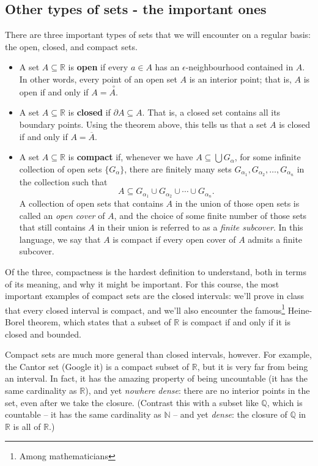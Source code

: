 \documentclass[12pt,letterpaper]{article}
\newcommand{\R}{\mathbb{R}}
\newcommand{\inter}[1]{\overset{\,\,\,\circ}{#1}}
\begin{document}
\subsection*{Other types of sets -  the important ones}
There are three important types of sets that we will encounter on a regular basis: the open, closed, and compact sets.
\begin{itemize}
\item A set $A\subseteq \R$ is {\bf open} if every $a\in A$ has an $\epsilon$-neighbourhood contained in $A$. In other words, every point of an open set $A$ is an interior point; that is, $A$ is open if and only if $A = \inter{A}$.
\item A set $A\subseteq \R$ is {\bf closed} if $\partial A\subseteq A$. That is, a closed set contains all its boundary points. Using the theorem above, this tells us that a set $A$ is closed if and only if $A=\overline{A}$.
\item A set $A\subseteq \R$ is {\bf compact} if, whenever we have $A\subseteq \bigcup G_\alpha$, for some infinite collection of open sets $\{G_\alpha\}$, there are finitely many sets $G_{\alpha_1},G_{\alpha_2},\ldots, G_{\alpha_n}$ in the collection such that
\[
A\subseteq G_{\alpha_1}\cup G_{\alpha_2}\cup \cdots \cup G_{\alpha_n}.
\]
A collection of open sets that contains $A$ in the union of those open sets is called an {\em open cover} of $A$, and the choice of some finite number of those sets that still contains $A$ in their union is referred to as a {\em finite subcover}. In this language, we say that $A$ is compact if every open cover of $A$ admits a finite subcover.
\end{itemize}
Of the three, compactness is the hardest definition to understand, both in terms of its meaning, and why it might be important. For this course, the most important examples of compact sets are the closed intervals: we'll prove in class that every closed interval is compact, and we'll also encounter the famous\footnote{Among mathematicians} Heine-Borel theorem, which states that a subset of $\R$ is compact if and only if it is closed and bounded.

Compact sets are much more general than closed intervals, however. For example, the Cantor set (Google it) is a compact subset of $\R$, but it is very far from being an interval. In fact, it has the amazing property of being uncountable (it has the same cardinality as $\R$), and yet {\em nowhere dense}: there are no interior points in the set, even after we take the closure. (Contrast this with a subset like $\mathbb{Q}$, which is countable -- it has the same cardinality as $\mathbb{N}$ --  and yet {\em dense}: the closure of $\mathbb{Q}$ in $\R$ is all of $\R$.)
\end{document}
